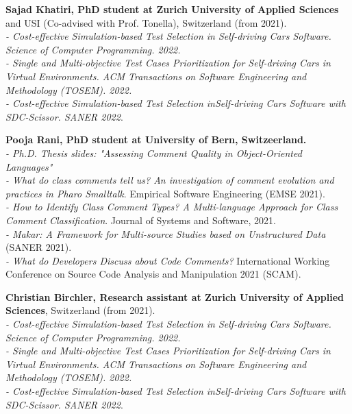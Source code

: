 \documentclass[10pt]{article}
\begin{document}
\begin{bibsection}

\item \textbf{Sajad Khatiri, PhD student at Zurich University of Applied Sciences} and USI (Co-advised with Prof. Tonella), Switzerland (from 2021).\\
\textit{- Cost-effective Simulation-based Test Selection in Self-driving Cars Software. Science of Computer Programming. 2022.}\\
\textit{- Single and Multi-objective Test Cases Prioritization for Self-driving Cars in Virtual Environments. ACM Transactions on Software Engineering and Methodology (TOSEM). 2022.}\\
\textit{- Cost-effective Simulation-based Test Selection inSelf-driving Cars Software with SDC-Scissor.  SANER 2022}.   

\item \textbf{Pooja Rani, PhD student at University of Bern, Switzeerland. }\\
 \textit{- Ph.D. Thesis slides: "Assessing Comment Quality in Object-Oriented Languages"}\\
       \textit{- What do class comments tell us? An investigation of comment evolution and practices in Pharo Smalltalk}. Empirical Software Engineering (EMSE 2021).\\
       \textit{- How to Identify Class Comment Types? A Multi-language Approach for Class Comment Classification}. Journal of Systems and Software, 2021. \\
       \textit{- Makar: A Framework for Multi-source Studies based on Unstructured Data}  (SANER 2021).\\
       \textit{- What do Developers Discuss about Code Comments?} International Working Conference on Source Code Analysis and Manipulation 2021 (SCAM).\\

\item \textbf{Christian Birchler, Research assistant at Zurich University of Applied Sciences}, Switzerland (from 2021). \\
\textit{- Cost-effective Simulation-based Test Selection in Self-driving Cars Software. Science of Computer Programming. 2022.}\\
\textit{- Single and Multi-objective Test Cases Prioritization for Self-driving Cars in Virtual Environments. ACM Transactions on Software Engineering and Methodology (TOSEM). 2022.}\\
\textit{- Cost-effective Simulation-based Test Selection inSelf-driving Cars Software with SDC-Scissor.  SANER 2022}. 


\end{bibsection}
\end{document}
